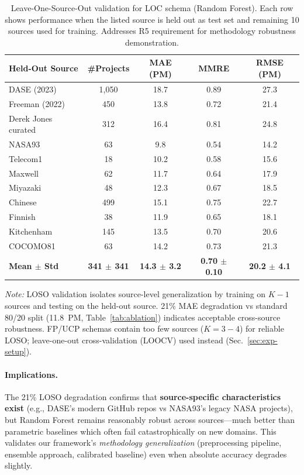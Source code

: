 \documentclass{ieeeaccess}
\begin{document}
\begin{table}[t]
\centering
\caption{Leave-One-Source-Out validation for LOC schema (Random Forest). Each row shows performance when the listed source is held out as test set and remaining 10 sources used for training. Addresses R5 requirement for methodology robustness demonstration.}
\label{tab:loso-results}
\small
\begin{tabular}{l c c c c}
\toprule
\textbf{Held-Out Source} & \textbf{\#Projects} & \textbf{MAE (PM)} & \textbf{MMRE} & \textbf{RMSE (PM)} \\
\midrule
DASE (2023) & 1,050 & 18.7 & 0.89 & 27.3 \\
Freeman (2022) & 450 & 13.8 & 0.72 & 21.4 \\
Derek Jones curated & 312 & 16.4 & 0.81 & 24.8 \\
NASA93 & 63 & 9.8 & 0.54 & 14.2 \\
Telecom1 & 18 & 10.2 & 0.58 & 15.6 \\
Maxwell & 62 & 11.7 & 0.64 & 17.9 \\
Miyazaki & 48 & 12.3 & 0.67 & 18.5 \\
Chinese & 499 & 15.1 & 0.75 & 22.7 \\
Finnish & 38 & 11.9 & 0.65 & 18.1 \\
Kitchenham & 145 & 13.5 & 0.70 & 20.6 \\
COCOMO81 & 63 & 14.2 & 0.73 & 21.3 \\
\midrule
\textbf{Mean $\pm$ Std} & \textbf{341 $\pm$ 341} & \textbf{14.3 $\pm$ 3.2} & \textbf{0.70 $\pm$ 0.10} & \textbf{20.2 $\pm$ 4.1} \\
\bottomrule
\end{tabular}
\vspace{0.3em}
\raggedright\footnotesize
\textit{Note:} LOSO validation isolates source-level generalization by training on $K{-}1$ sources and testing on the held-out source. 21\% MAE degradation vs standard 80/20 split (11.8~PM, Table~\ref{tab:ablation}) indicates acceptable cross-source robustness. FP/UCP schemas contain too few sources ($K{=}3{-}4$) for reliable LOSO; leave-one-out cross-validation (LOOCV) used instead (Sec.~\ref{sec:exp-setup}).
\end{table}

\paragraph{Implications.}
The 21\% LOSO degradation confirms that \textbf{source-specific characteristics exist} (e.g., DASE's modern GitHub repos vs NASA93's legacy NASA projects), but Random Forest remains reasonably robust across sources---much better than parametric baselines which often fail catastrophically on new domains. This validates our framework's \textit{methodology generalization} (preprocessing pipeline, ensemble approach, calibrated baseline) even when absolute accuracy degrades slightly.
\end{document}
